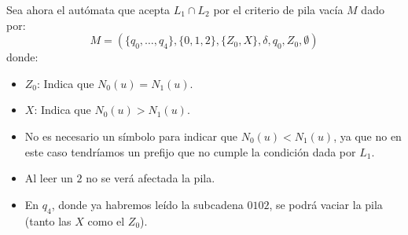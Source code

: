 \begin{ejercicio}
\begin{description}
        Sea ahora el autómata que acepta $L_1\cap L_2$ por el criterio de pila vacía $M$ dado por:
        \begin{equation*}
            M = (\{q_0,\ldots,q_4\},\{0,1,2\},\{Z_0,X\},\delta,q_0,Z_0,\emptyset)
        \end{equation*}
        donde:
        \begin{itemize}
            \item $Z_0$: Indica que $N_0(u)=N_1(u)$.
            \item $X$: Indica que $N_0(u)>N_1(u)$.
            \item No es necesario un símbolo para indicar que $N_0(u)<N_1(u)$, ya que no en este caso tendríamos un prefijo que no cumple la condición dada por $L_1$.
            \item Al leer un $2$ no se verá afectada la pila.
            \item En $q_4$, donde ya habremos leído la subcadena $0102$, se podrá vaciar la pila (tanto las $X$ como el $Z_0$).
        \end{itemize}


\end{description}
\end{ejercicio}
